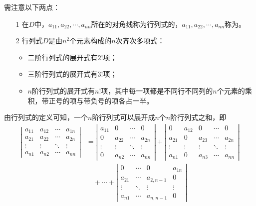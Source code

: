 \begin{zhu}
  需注意以下两点：
  \begin{enumerate}
  \item[1]
    在$D$中，$a_{11},a_{22},\cdots,a_{nn}$所在的对角线称为行列式的，$a_{11},a_{22},\cdots,a_{nn}$称为。
  \item[2]
    行列式$D$是由$n^2$个元素构成的$n$次齐次多项式：
    \begin{itemize}
    \item 二阶行列式的展开式有$2!$项；
    \item 三阶行列式的展开式有$3!$项；
    \item $n$阶行列式的展开式有$n!$项，其中每一项都是不同行不同列的$n$个元素的乘积，带正号的项与带负号的项各占一半。
    \end{itemize}      
  \end{enumerate}    
\end{zhu}
由行列式的定义可知，一个$n$阶行列式可以展开成$n$个$n$阶行列式之和，即
$$
\begin{aligned}
  \left|
    \begin{array}{cccc}
      a_{11}  &  a_{12} & \cdots & a_{1n} \\
      a_{21}  &  a_{22} & \cdots & a_{2n} \\
      \vdots & \vdots & \ddots & \vdots\\  
      a_{n1}  &  a_{n2} & \cdots & a_{nn} 
    \end{array}
  \right| &= 
  \left|
    \begin{array}{cccc}
      a_{11}  &  0 & \cdots & 0 \\
      0  &  a_{22} & \cdots & a_{2n} \\
      \vdots & \vdots & \ddots & \vdots\\  
      0  &  a_{n2} & \cdots & a_{nn} 
    \end{array}
  \right|  + \left|
    \begin{array}{ccccc}
      0  &  a_{12} & 0 & \cdots & 0 \\
      a_{21} & 0  &  a_{23} & \cdots & a_{2n} \\
      \vdots & \vdots & \vdots & \ddots & \vdots\\  
      a_{n1}  & 0&  a_{n3} & \cdots & a_{nn} 
    \end{array}
  \right| \\[0.1in]
  & \quad + \cdots  
  + 
  \left|
    \begin{array}{cccc}
      0 & \cdots & 0 & a_{1n} \\
      a_{21}  &   \cdots & a_{2,n-1} & 0 \\
      \vdots &  \ddots & \vdots & \vdots\\  
      a_{n1}  &   \cdots & a_{n,n-1} & 0
    \end{array}
  \right| 
\end{aligned}
$$


